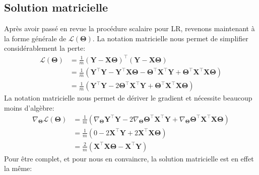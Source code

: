 \subsection{Solution matricielle}\label{sec:linreg_matrix_sol}

Après avoir passé en revue la procédure scalaire pour LR, revenons maintenant à la forme générale de $\mathcal L(\bm\Theta)$. La notation matricielle nous permet de simplifier considérablement la perte:
%
\begin{align}
\mathcal L(\bm\Theta) & = \frac{1}{m} (\mathbf Y - \mathbf X \bm\Theta)^\intercal(\mathbf Y - \mathbf X \bm\Theta) \\ &= \frac{1}{m} (\mathbf Y^\intercal \mathbf Y - \mathbf Y^\intercal \mathbf X \bm\Theta - \bm\Theta^\intercal \mathbf X^\intercal \mathbf Y + \bm\Theta^\intercal \mathbf X^\intercal \mathbf X \bm\Theta) \\ &= \frac{1}{m} (\mathbf Y^\intercal \mathbf Y - 2 \bm\Theta^\intercal \mathbf X^\intercal \mathbf Y + \bm\Theta^\intercal \mathbf X^\intercal \mathbf X \bm\Theta)
\end{align}
%
La notation matricielle nous permet de dériver le gradient et nécessite beaucoup moins d'algèbre:
%
\begin{align}
\nabla_{\bm\Theta}\mathcal L(\bm\Theta) & = \frac{1}{m} (\nabla_{\bm\Theta}\mathbf Y^\intercal \mathbf Y - 2 \nabla_{\bm\Theta} \bm\Theta^\intercal \mathbf X^\intercal \mathbf Y + \nabla_{\bm\Theta}\bm\Theta^\intercal \mathbf X^\intercal \mathbf X \bm\Theta) \\ & = \frac{1}{m} ( 0 - 2\mathbf{X}^\intercal \mathbf Y + 2 \mathbf{X}^\intercal \mathbf X \bm\Theta ) \\ & = \boxed{\frac{2}{m} (\mathbf{X}^\intercal \mathbf X \bm\Theta - \mathbf{X}^\intercal \mathbf Y)}
\end{align}
%
Pour être complet, et pour nous en convaincre, la solution matricielle est en effet la même:
%

